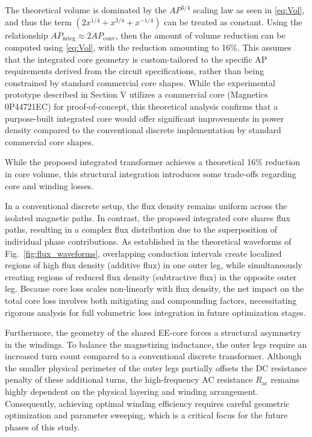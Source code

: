 \documentclass[lettersize,journal]{IEEEtran}
\begin{document}
{\color{red} The theoretical volume is dominated by the $AP^{3/4}$ scaling law as seen in \eqref{eq:Vol}, and thus the term $\left( 2x^{1/4} + x^{3/4} + x^{-1/4} \right)$ can be treated as constant. Using the relationship $AP_{\mathrm{integ}} \approx 2 AP_{\mathrm{conv}}$, then the amount of volume reduction can be computed using \eqref{eq:Vol}, with the reduction amounting to 16\%.} This assumes that the integrated core geometry is custom-tailored to the specific AP requirements derived from the circuit specifications, rather than being constrained by standard commercial core shapes. While the experimental prototype described in Section V utilizes a commercial core (Magnetics 0P44721EC) for proof-of-concept, this theoretical analysis confirms that a purpose-built integrated core would offer significant improvements in power density compared to the conventional discrete implementation {\color{red} by standard commercial core shapes.}
{\color{red}
While the proposed integrated transformer achieves a theoretical 16\% reduction in core volume, this structural integration introduces some trade-offs regarding core and winding losses.

In a conventional discrete setup, the flux density remains uniform across the isolated magnetic paths. In contrast, the proposed integrated core shares flux paths, resulting in a complex flux distribution due to the superposition of individual phase contributions. As established in the theoretical waveforms of Fig.~\ref{fig:flux_waveforms}, overlapping conduction intervals create localized regions of high flux density (additive flux) in one outer leg, while simultaneously creating regions of reduced flux density (subtractive flux) in the opposite outer leg. Because core loss scales non-linearly with flux density, the net impact on the total core loss involves both mitigating and compounding factors, necessitating rigorous analysis for full volumetric loss integration in future optimization stages.

Furthermore, the geometry of the shared EE-core forces a structural asymmetry in the windings. To balance the magnetizing inductance, the outer legs require an increased turn count compared to a conventional discrete transformer. Although the smaller physical perimeter of the outer legs partially offsets the DC resistance penalty of these additional turns, the high-frequency AC resistance $R_{\mathrm{ac}}$ remains highly dependent on the physical layering and winding arrangement. Consequently, achieving optimal winding efficiency requires careful geometric optimization and parameter sweeping, which is a critical focus for the future phases of this study.}
\end{document}
